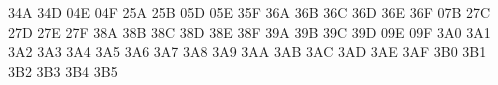{ \mtsyadef@{}
 \mtsyadef@{}
 \mtsyadef@{}
 \mtsyadef@{}
 \mtsyadef@{}
 \mtsyadef@{}
 \mtsyadef@\blacktriangleleft34A
 \mtsyadef@\vartriangle34D
 \mtsyadef@\blacktriangle04E
 \mtsyadef@\triangledown04F
 \mtsyadef@{}
 \mtsyadef@{}
 \mtsyadef@{}
 \mtsyadef@{}
 \mtsyadef@{}
 \mtsyadef@{}
 \mtsyadef@{}
 \mtsyadef@{}
 \mtsyadef@\barwedge25A
 \mtsyadef@\doublebarwedge25B
 \mtsyadef@\measuredangle05D
 \mtsyadef@\sphericalangle05E
 \mtsyadef@\varpropto35F
 \mtsyadef@{}
 \mtsyadef@{}
 \mtsyadef@{}
 \mtsyadef@{}
 \mtsyadef@{}
 \let\doublecup\Cup
 \mtsyadef@{}
 \let\doublecap\Cap
 \mtsyadef@{}
 \mtsyadef@{}
 \mtsyadef@{}
 \mtsyadef@{}
 \mtsyadef@\subseteqq36A
 \mtsyadef@\supseteqq36B
 \mtsyadef@\bumpeq36C
 \mtsyadef@\Bumpeq36D
 \mtsyadef@\lll36E
 \let\llless\lll
 \mtsyadef@\ggg36F
 \let\gggtr\ggg
 \mtsyadef@{}
 \mtsyadef@{}
 \mtsyadef@{}
 \mtsyadef@{}
 \mtsyadef@{}
 \mtsyadef@\complement07B
 \mtsyadef@\intercal27C
 \mtsyadef@\circledcirc27D
 \mtsyadef@\circledast27E
 \mtsyadef@\circleddash27F
 \mtsyadef@{}
 \mtsyadef@{}
 \mtsyadef@{}
 \mtsyadef@{}
 \mtsyadef@{}
 \mtsyadef@{}
 \mtsyadef@{}
 \mtsyadef@{}
 \mtsyadef@{}
 \mtsyadef@{}
 \mtsyadef@\nleqslant38A
 \mtsyadef@\ngeqslant38B
 \mtsyadef@\lneq38C
 \mtsyadef@\gneq38D
 \mtsyadef@\npreceq38E
 \mtsyadef@\nsucceq38F
 \mtsyadef@{}
 \mtsyadef@{}
 \mtsyadef@{}
 \mtsyadef@{}
 \mtsyadef@{}
 \mtsyadef@{}
 \mtsyadef@{}
 \mtsyadef@{}
 \mtsyadef@{}
 \mtsyadef@{}
 \mtsyadef@\lnapprox39A
 \mtsyadef@\gnapprox39B
 \mtsyadef@\nsim39C
 \mtsyadef@\ncong39D
 \mtsyadef@\diagup09E
 \mtsyadef@\diagdown09F
 \mtsyadef@\varsubsetneq3A0
 \mtsyadef@\varsupsetneq3A1
 \mtsyadef@\nsubseteqq3A2
 \mtsyadef@\nsupseteqq3A3
 \mtsyadef@\subsetneqq3A4
 \mtsyadef@\supsetneqq3A5
 \mtsyadef@\varsubsetneqq3A6
 \mtsyadef@\varsupsetneqq3A7
 \mtsyadef@\subsetneq3A8
 \mtsyadef@\supsetneq3A9
 \mtsyadef@\nsubseteq3AA
 \mtsyadef@\nsupseteq3AB
 \mtsyadef@\nparallel3AC
 \mtsyadef@\nmid3AD
 \mtsyadef@\nshortmid3AE
 \mtsyadef@\nshortparallel3AF
 \mtsyadef@\nvdash3B0
 \mtsyadef@\nVdash3B1
 \mtsyadef@\nvDash3B2
 \mtsyadef@\nVDash3B3
 \mtsyadef@\ntrianglerighteq3B4
 \mtsyadef@\ntrianglelefteq3B5
}

